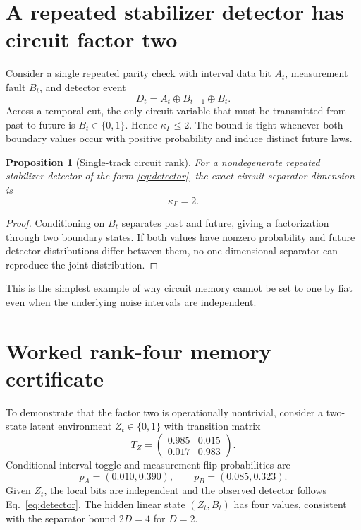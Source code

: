 \documentclass[11pt]{article}
\newtheorem{proposition}[theorem]{Proposition}
\begin{document}
\section{A repeated stabilizer detector has circuit factor two}
Consider a single repeated parity check with interval data bit $A_t$, measurement fault $B_t$, and detector event
\begin{equation}
D_t=A_t\oplus B_{t-1}\oplus B_t.
\label{eq:detector}
\end{equation}
Across a temporal cut, the only circuit variable that must be transmitted from past to future is $B_t\in\{0,1\}$. Hence $\kappa_\Gamma\le2$. The bound is tight whenever both boundary values occur with positive probability and induce distinct future laws.

\begin{proposition}[Single-track circuit rank]
For a nondegenerate repeated stabilizer detector of the form \eqref{eq:detector}, the exact circuit separator dimension is
\begin{equation}
\boxed{\kappa_\Gamma=2.}
\end{equation}
\end{proposition}
\begin{proof}
Conditioning on $B_t$ separates past and future, giving a factorization through two boundary states. If both values have nonzero probability and future detector distributions differ between them, no one-dimensional separator can reproduce the joint distribution.
\end{proof}

This is the simplest example of why circuit memory cannot be set to one by fiat even when the underlying noise intervals are independent.

\section{Worked rank-four memory certificate}
To demonstrate that the factor two is operationally nontrivial, consider a two-state latent environment $Z_t\in\{0,1\}$ with transition matrix
\begin{equation}
T_Z=\begin{pmatrix}0.985&0.015\\0.017&0.983\end{pmatrix}.
\end{equation}
Conditional interval-toggle and measurement-flip probabilities are
\begin{equation}
p_A=(0.010,0.390),\qquad p_B=(0.085,0.323).
\end{equation}
Given $Z_t$, the local bits are independent and the observed detector follows Eq.~\eqref{eq:detector}. The hidden linear state $(Z_t,B_t)$ has four values, consistent with the separator bound $2D=4$ for $D=2$.
\end{document}
